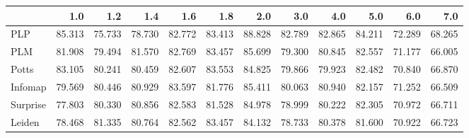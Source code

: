 \begin{tabular}{lrrrrrrrrrrr}
\toprule
{} &    1.0 &    1.2 &    1.4 &    1.6 &    1.8 &    2.0 &    3.0 &    4.0 &    5.0 &    6.0 &    7.0 \\
\midrule
PLP      & 85.313 & 75.733 & 78.730 & 82.772 & 83.413 & 88.828 & 82.789 & 82.865 & 84.211 & 72.289 & 68.265 \\
PLM      & 81.908 & 79.494 & 81.570 & 82.769 & 83.457 & 85.699 & 79.300 & 80.845 & 82.557 & 71.177 & 66.005 \\
Potts    & 83.105 & 80.241 & 80.459 & 82.607 & 83.553 & 84.825 & 79.866 & 79.923 & 82.482 & 70.840 & 66.870 \\
Infomap  & 79.569 & 80.446 & 80.929 & 83.597 & 81.776 & 85.411 & 80.063 & 80.940 & 82.157 & 71.252 & 66.509 \\
Surprise & 77.803 & 80.330 & 80.856 & 82.583 & 81.528 & 84.978 & 78.999 & 80.222 & 82.305 & 70.972 & 66.711 \\
Leiden   & 78.468 & 81.335 & 80.764 & 82.562 & 83.457 & 84.132 & 78.733 & 80.378 & 81.600 & 70.922 & 66.723 \\
\bottomrule
\end{tabular}
